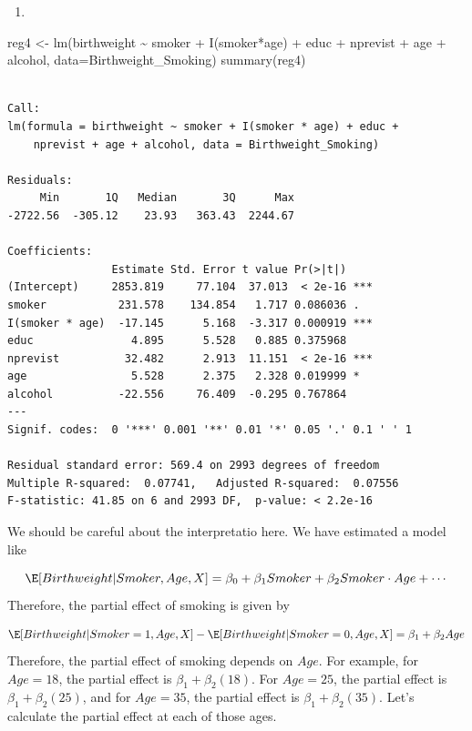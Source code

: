 \documentclass[
  letterpaper,
  DIV=11,
  numbers=noendperiod]{scrreprt}
\newenvironment{Shaded}{\begin{snugshade}}{\end{snugshade}}
\newcommand{\AttributeTok}[1]{\textcolor[rgb]{0.40,0.45,0.13}{#1}}
\newcommand{\FunctionTok}[1]{\textcolor[rgb]{0.28,0.35,0.67}{#1}}
\newcommand{\NormalTok}[1]{\textcolor[rgb]{0.00,0.23,0.31}{#1}}
\newcommand{\OtherTok}[1]{\textcolor[rgb]{0.00,0.23,0.31}{#1}}
\newcommand{\SpecialCharTok}[1]{\textcolor[rgb]{0.37,0.37,0.37}{#1}}
\providecommand{\tightlist}{%
  \setlength{\itemsep}{0pt}\setlength{\parskip}{0pt}}\usepackage{longtable,booktabs,array}
\begin{document}
\begin{enumerate}
\def\labelenumi{\arabic{enumi}.}
\setcounter{enumi}{3}
\tightlist
\item
\end{enumerate}

\begin{Shaded}
\begin{Highlighting}[]
\NormalTok{reg4 }\OtherTok{\textless{}{-}} \FunctionTok{lm}\NormalTok{(birthweight }\SpecialCharTok{\textasciitilde{}}\NormalTok{ smoker }\SpecialCharTok{+} \FunctionTok{I}\NormalTok{(smoker}\SpecialCharTok{*}\NormalTok{age) }\SpecialCharTok{+}\NormalTok{ educ }\SpecialCharTok{+}\NormalTok{ nprevist }\SpecialCharTok{+}\NormalTok{ age }\SpecialCharTok{+}\NormalTok{ alcohol,}
           \AttributeTok{data=}\NormalTok{Birthweight\_Smoking)}
\FunctionTok{summary}\NormalTok{(reg4)}
\end{Highlighting}
\end{Shaded}

\begin{verbatim}

Call:
lm(formula = birthweight ~ smoker + I(smoker * age) + educ + 
    nprevist + age + alcohol, data = Birthweight_Smoking)

Residuals:
     Min       1Q   Median       3Q      Max 
-2722.56  -305.12    23.93   363.43  2244.67 

Coefficients:
                Estimate Std. Error t value Pr(>|t|)    
(Intercept)     2853.819     77.104  37.013  < 2e-16 ***
smoker           231.578    134.854   1.717 0.086036 .  
I(smoker * age)  -17.145      5.168  -3.317 0.000919 ***
educ               4.895      5.528   0.885 0.375968    
nprevist          32.482      2.913  11.151  < 2e-16 ***
age                5.528      2.375   2.328 0.019999 *  
alcohol          -22.556     76.409  -0.295 0.767864    
---
Signif. codes:  0 '***' 0.001 '**' 0.01 '*' 0.05 '.' 0.1 ' ' 1

Residual standard error: 569.4 on 2993 degrees of freedom
Multiple R-squared:  0.07741,   Adjusted R-squared:  0.07556 
F-statistic: 41.85 on 6 and 2993 DF,  p-value: < 2.2e-16
\end{verbatim}

We should be careful about the interpretatio here. We have estimated a
model like

\[
  \E[Birthweight|Smoker, Age, X] = \beta_0 + \beta_1 Smoker + \beta_2 Smoker \cdot Age + \cdots
\] Therefore, the partial effect of smoking is given by

\[
  \E[Birthweight | Smoker=1, Age, X] - \E[Birthweight | Smoker=0, Age, X] = \beta_1 + \beta_2 Age
\] Therefore, the partial effect of smoking depends on \(Age\). For
example, for \(Age=18\), the partial effect is
\(\beta_1 + \beta_2 (18)\). For \(Age=25\), the partial effect is
\(\beta_1 + \beta_2 (25)\), and for \(Age=35\), the partial effect is
\(\beta_1 + \beta_2 (35)\). Let's calculate the partial effect at each
of those ages.
\end{document}
